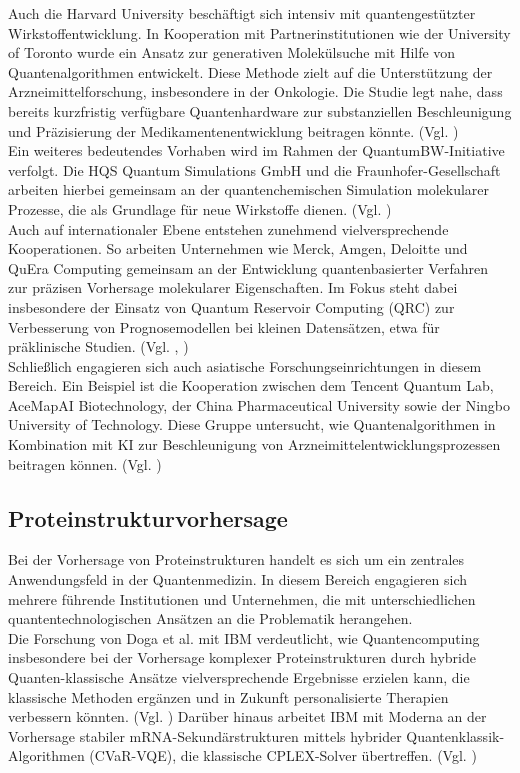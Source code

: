 Auch die Harvard University beschäftigt sich intensiv mit quantengestützter Wirkstoffentwicklung. In Kooperation mit Partnerinstitutionen wie der University of Toronto wurde ein Ansatz zur generativen Molekülsuche mit Hilfe von Quantenalgorithmen entwickelt. Diese Methode zielt auf die Unterstützung der Arzneimittelforschung, insbesondere in der Onkologie. Die Studie legt nahe, dass bereits kurzfristig verfügbare Quantenhardware zur substanziellen Beschleunigung und Präzisierung der Medikamentenentwicklung beitragen könnte. (Vgl. \cite{vakiliQuantumComputingEnhancedAlgorithm2024})\\

Ein weiteres bedeutendes Vorhaben wird im Rahmen der QuantumBW-Initiative verfolgt. Die HQS Quantum Simulations GmbH und die Fraunhofer-Gesellschaft arbeiten hierbei gemeinsam an der quantenchemischen Simulation molekularer Prozesse, die als Grundlage für neue Wirkstoffe dienen. (Vgl. \cite{fraunhofer_iais_quantum_2023})\\

Auch auf internationaler Ebene entstehen zunehmend vielversprechende Kooperationen. So arbeiten Unternehmen wie Merck, Amgen, Deloitte und QuEra Computing gemeinsam an der Entwicklung quantenbasierter Verfahren zur präzisen Vorhersage molekularer Eigenschaften. Im Fokus steht dabei insbesondere der Einsatz von Quantum Reservoir Computing (QRC) zur Verbesserung von Prognosemodellen bei kleinen Datensätzen, etwa für präklinische Studien. (Vgl. \cite{beaulieu_robust_2024}, \cite{kornjaca_large-scale_2024})\\

Schließlich engagieren sich auch asiatische Forschungseinrichtungen in diesem Bereich. Ein Beispiel ist die Kooperation zwischen dem Tencent Quantum Lab, AceMapAI Biotechnology, der China Pharmaceutical University sowie der Ningbo University of Technology. Diese Gruppe untersucht, wie Quantenalgorithmen in Kombination mit KI zur Beschleunigung von Arzneimittelentwicklungsprozessen beitragen können. (Vgl. \cite{li_hybrid_2024})\\


\subsection*{Proteinstrukturvorhersage}

Bei der Vorhersage von Proteinstrukturen handelt es sich um ein zentrales Anwendungsfeld in der Quantenmedizin. In diesem Bereich engagieren sich mehrere führende Institutionen und Unternehmen, die mit unterschiedlichen quantentechnologischen Ansätzen an die Problematik herangehen.\\
Die Forschung von Doga et al. mit IBM verdeutlicht, wie Quantencomputing insbesondere bei der Vorhersage komplexer Proteinstrukturen durch hybride Quanten-klassische Ansätze vielversprechende Ergebnisse erzielen kann, die klassische Methoden ergänzen und in Zukunft personalisierte Therapien verbessern könnten. (Vgl. \cite{doga_perspective_2024})
Darüber hinaus arbeitet IBM mit Moderna an der Vorhersage stabiler mRNA-Sekundärstrukturen mittels hybrider Quantenklassik-Algorithmen (CVaR-VQE), die klassische CPLEX-Solver übertreffen. (Vgl. \cite{hou_lipid_2021})\\

